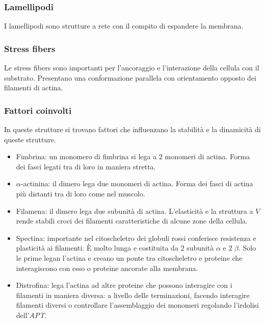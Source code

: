 		\subsubsection{Lamellipodi}
		I lamellipodi sono strutture a rete con il compito di espandere la membrana.

		\subsubsection{Stress fibers}
		Le stress fibers sono importanti per l'ancoraggio e l'interazione della cellula con il substrato.
		Presentano una conformazione parallela con orientamento opposto dei filamenti di actina.

		\subsubsection{Fattori coinvolti}
		In queste strutture si trovano fattori che influenzano la stabilit\`a e la dinamicit\`a di queste strutture.
		\begin{multicols}{2}
			\begin{itemize}
				\item Fimbrina: un monomero di fimbrina si lega a $2$ monomeri di actina.
					Forma dei fasci legati tra di loro in maniera stretta.
				\item $\alpha$-actinina: il dimero lega due monomeri di actina.
					Forma dei fasci di actina pi\`u distanti tra di loro come nel muscolo.
				\item Filamena: il dimero lega due subunit\`a di actina.
					L'elasticit\`a e la struttura a $V$ rende stabili croci dei filamenti caratteristiche di alcune zone della cellula.
				\item Spectina: importante nel citoscheletro dei globuli rossi conferisce resistenza e plasticit\`a ai filamenti.
					\`E molto lunga e costituita da $2$ subunit\`a $\alpha$ e $2$ $\beta$.
					Solo le prime legan l'actina e creano un ponte tra citoscheletro e proteine che interagiscono con esso o proteine ancorate alla membrana.
				\item Distrofina: lega l'actina ad altre proteine che possono interagire con i filamenti in maniera diversa: a livello delle terminazioni, facendo interagire filamenti diversi o controllare l'assemblaggio dei monomeri regolando l'irdolisi dell'\emph{APT}.
			\end{itemize}
		\end{multicols}

